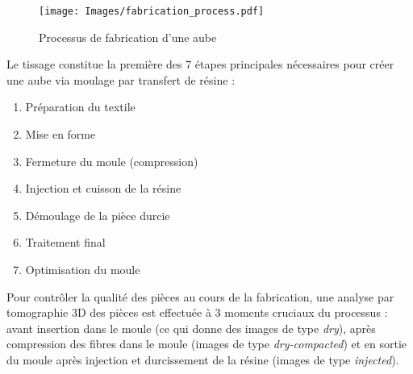 \documentclass{article}
\begin{document}
\begin{minipage}{0.5\textwidth}
\begin{figure}[H]
    \centering
    \texttt{[image: Images/fabrication\_process.pdf]}
    \caption{Processus de fabrication d'une aube}
\end{figure}
\end{minipage}
\begin{minipage}{0.02\textwidth}
\hfill
\end{minipage}
\begin{minipage}{0.48\textwidth}
Le tissage constitue la première des 7 étapes principales nécessaires pour créer une aube via moulage par transfert de résine : 
\begin{enumerate}
    \item Préparation du textile
    \item Mise en forme
    \item Fermeture du moule (compression)
    \item Injection et cuisson de la résine
    \item Démoulage de la pièce durcie
    \item Traitement final
    \item Optimisation du moule
\end{enumerate}
Pour contrôler la qualité des pièces au cours de la fabrication, une analyse par tomographie 3D des pièces est effectuée à 3 moments cruciaux du processus : avant insertion dans le moule (ce qui donne des images de type \textit{dry}), après compression des fibres dans le moule (images de type \textit{dry-compacted}) et en sortie du moule après injection et durcissement de la résine (images de type \textit{injected}).
\end{minipage}

\vspace{0.3cm}
\end{document}

